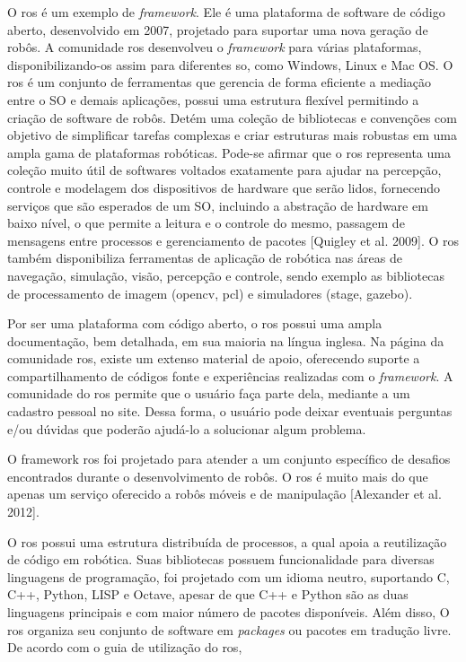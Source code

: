 O \gls*{ros} é um exemplo de \textit{framework}. Ele é uma plataforma de software de código aberto, desenvolvido em 2007, projetado para suportar uma nova geração de robôs. A comunidade \gls*{ros} desenvolveu o \textit{framework} para várias plataformas, disponibilizando-os assim para diferentes \gls*{so}, como Windows, Linux e Mac OS. O \gls*{ros} é um conjunto de ferramentas que gerencia de forma eficiente  a mediação entre o SO e demais aplicações, possui uma estrutura flexível permitindo a criação de software de robôs. Detém uma coleção de bibliotecas e convenções com objetivo de simplificar tarefas complexas e criar estruturas mais robustas em uma ampla gama de plataformas robóticas. Pode-se afirmar que o \gls*{ros} representa uma coleção muito útil de softwares voltados exatamente para ajudar na percepção, controle e modelagem dos dispositivos de hardware que serão lidos, fornecendo serviços que são esperados de um SO, incluindo a abstração de hardware em baixo nível, o que permite a leitura e o controle do mesmo, passagem de mensagens entre processos e gerenciamento de pacotes [Quigley et al. 2009]. O \gls*{ros} também disponibiliza ferramentas de aplicação de robótica nas áreas de navegação, simulação, visão, percepção e controle, sendo exemplo as bibliotecas de processamento de imagem (opencv, pcl) e simuladores (stage, gazebo).

Por ser uma plataforma com código aberto, o \gls*{ros} possui uma ampla documentação, bem detalhada, em sua maioria na língua inglesa. Na página da comunidade \gls*{ros}, existe um extenso material de apoio, oferecendo suporte a compartilhamento de códigos fonte e experiências realizadas com o \textit{framework}. A comunidade do \gls*{ros} permite que o usuário faça parte dela, mediante a um cadastro pessoal no site. Dessa forma, o usuário pode deixar eventuais perguntas e/ou dúvidas que poderão ajudá-lo a solucionar algum problema.

O framework \gls*{ros} foi projetado para atender a um conjunto específico de desafios encontrados durante o desenvolvimento de robôs. O \gls*{ros} é muito mais do que apenas um serviço oferecido a robôs móveis e de manipulação [Alexander et al. 2012].

O \gls*{ros} possui uma estrutura distribuída de processos, a qual apoia a reutilização de código em robótica. Suas bibliotecas possuem funcionalidade para diversas linguagens de programação, foi projetado com um idioma neutro, suportando C, C++, Python, LISP e Octave, apesar de que C++ e Python são as duas linguagens principais e com maior número de pacotes disponíveis. Além disso, O \gls*{ros} organiza seu conjunto de software em \textit{packages} ou pacotes em tradução livre. De acordo com o guia de utilização do \gls*{ros},

